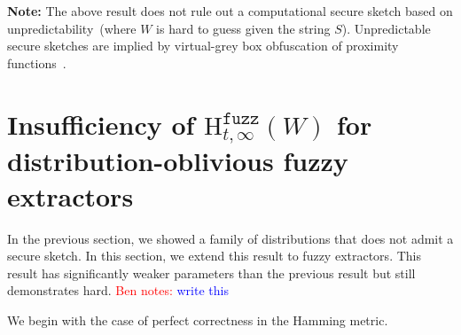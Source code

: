 \documentclass[11pt]{article}
\newcommand{\class}[1]{{\ensuremath{\mathsf{#1}}}}
\newcommand{\sketch}{\ensuremath{\class{SS}}\xspace}
\newcommand{\rec}{\ensuremath{\class{Rec}}\xspace}
\newcommand{\Hfuzz}{\mathrm{H}^{\mathtt{fuzz}}_{t,\infty}}
\newtheorem{corollary}[theorem]{Corollary}
\newcommand{\authnote}[2]{{\textcolor{red}{\textsf{#1 notes: }\textcolor{blue}{ #2}}\marginpar{\textcolor{red}{\textbf{!!!!!}}}}}
\newcommand{\authnote}[2]{}
\newcommand{\bnote}[1]{{\authnote{Ben}{#1}}}
\begin{document}

\textbf{Note:} The above result does not rule out a computational secure sketch based on unpredictability~(where $W$ is hard to guess given the string $S$).  Unpredictable secure sketches are implied by virtual-grey box obfuscation of proximity functions~\cite{BitanskyCKP14}.  

\section{Insufficiency of $\Hfuzz(W)$ for distribution-oblivious fuzzy extractors}
In the previous section, we showed a family of distributions that does not admit a secure sketch.  In this section, we extend this result to fuzzy extractors.  This result has significantly weaker parameters than the previous result but still demonstrates hard.  \bnote{write this}

We begin with the case of perfect correctness in the Hamming metric.  
\end{document}
